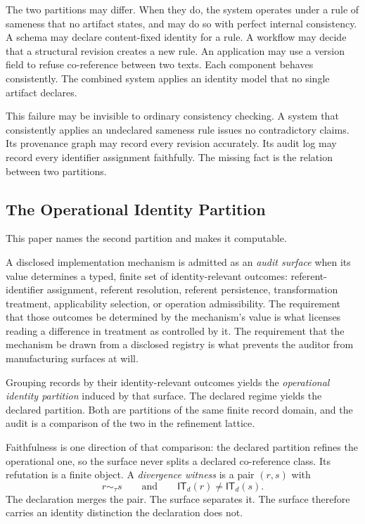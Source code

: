 \documentclass[11pt]{article}
\theoremstyle{plain}
\theoremstyle{definition}
\theoremstyle{remark}
\newcommand{\IT}{\ensuremath{\mathsf{IT}}}
\begin{document}
The two partitions may differ.
When they do, the system operates under a rule of sameness
that no artifact states,
and may do so with perfect internal consistency.
A schema may declare content-fixed identity for a rule.
A workflow may decide that a structural revision creates a new rule.
An application may use a version field to refuse co-reference between two texts.
Each component behaves consistently.
The combined system applies an identity model that no single artifact declares.

This failure may be invisible to ordinary consistency checking.
A system that consistently applies an undeclared sameness rule
issues no contradictory claims.
Its provenance graph may record every revision accurately.
Its audit log may record every identifier assignment faithfully.
The missing fact is the relation between two partitions.

\subsection{The Operational Identity Partition}

This paper names the second partition and makes it computable.

A disclosed implementation mechanism is admitted as an \emph{audit surface}
when its value determines a typed, finite set of identity-relevant outcomes:
referent-identifier assignment, referent resolution, referent persistence,
transformation treatment, applicability selection, or operation admissibility.
The requirement that those outcomes be determined by the mechanism's value
is what licenses reading a difference in treatment as controlled by it.
The requirement that the mechanism be drawn from a disclosed registry
is what prevents the auditor from manufacturing surfaces at will.

Grouping records by their identity-relevant outcomes
yields the \emph{operational identity partition} induced by that surface.
The declared regime yields the declared partition.
Both are partitions of the same finite record domain,
and the audit is a comparison of the two
in the refinement lattice.

Faithfulness is one direction of that comparison:
the declared partition refines the operational one,
so the surface never splits a declared co-reference class.
Its refutation is a finite object.
A \emph{divergence witness} is a pair \((r,s)\) with
\[
  r\sim_{\tau}s
  \qquad\text{and}\qquad
  \IT_d(r)\neq\IT_d(s).
\]
The declaration merges the pair.
The surface separates it.
The surface therefore carries an identity distinction the declaration does not.
\end{document}
